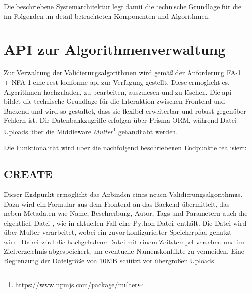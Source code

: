 Die beschriebene Systemarchitektur legt damit die technische Grundlage für die im Folgenden im detail betrachteten Komponenten und Algorithmen.



\section{API zur Algorithmenverwaltung}
\label{sec:konzept_api}

Zur Verwaltung der Validierungsalgorithmen wird gemäß der Anforderung FA-1 + NFA-1 eine \gls{rest}-konforme \gls{api} zur Verfügung gestellt. Diese ermöglicht es, Algorithmen hochzuladen, zu bearbeiten, auszulesen und zu löschen. Die \gls{api} bildet die technische Grundlage für die Interaktion zwischen Frontend und Backend und wird so gestaltet, dass sie flexibel erweiterbar und robust gegenüber Fehlern ist. Die Datenbankzugriffe erfolgen über Prisma ORM, während Datei-Uploads über die Middleware \textit{Multer}\footnote{https://www.npmjs.com/package/multer} gehandhabt werden.

Die Funktionalität wird über die nachfolgend beschriebenen Endpunkte realisiert:

\subsection{CREATE}
\label{subsec:api_create}

Dieser Endpunkt ermöglicht das Anbinden eines neuen Validierungsalgorithmus. Dazu wird ein Formular aus dem Frontend an das Backend übermittelt, das neben Metadaten wie Name, Beschreibung, Autor, Tags und Parametern auch die eigentlich Datei , wie in aktuellen Fall eine Python-Datei, enthält. Die Datei wird über Multer verarbeitet, wobei ein zuvor konfigurierter Speicherpfad genutzt wird. Dabei wird die hochgeladene Datei mit einem Zeitstempel versehen und im Zielverzeichnis abgespeichert, um eventuelle Namenskonflikte zu vermeiden. Eine Begrenzung der Dateigröße von 10MB schützt vor übergroßen Uploads.

